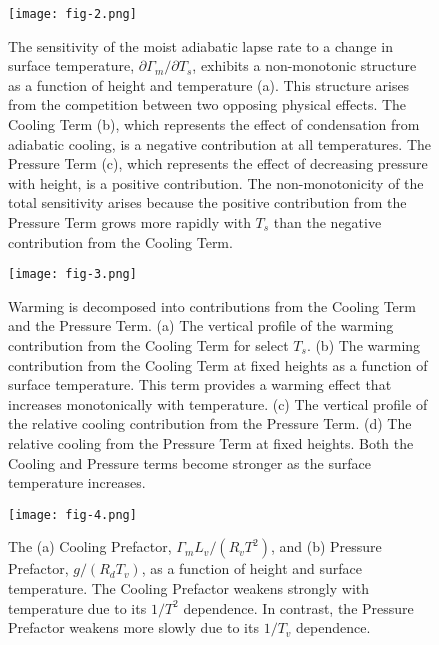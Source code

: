 \documentclass{ametsocV6.1}
\begin{document}
\begin{figure}[htbp]
 \centering
 \texttt{[image: fig-2.png]}\\
 \caption{The sensitivity of the moist adiabatic lapse rate to a change in surface temperature, $\partial\Gamma_m/\partial T_s$, exhibits a non-monotonic structure as a function of height and temperature (a). This structure arises from the competition between two opposing physical effects. The Cooling Term (b), which represents the effect of condensation from adiabatic cooling, is a negative contribution at all temperatures. The Pressure Term (c), which represents the effect of decreasing pressure with height, is a positive contribution. The non-monotonicity of the total sensitivity arises because the positive contribution from the Pressure Term grows more rapidly with $T_s$ than the negative contribution from the Cooling Term.}\label{fig:fig-2}
\end{figure}

\begin{figure}[htbp]
 \centering
 \texttt{[image: fig-3.png]}\\
 \caption{Warming is decomposed into contributions from the Cooling Term and the Pressure Term. (a) The vertical profile of the warming contribution from the Cooling Term for select $T_s$. (b) The warming contribution from the Cooling Term at fixed heights as a function of surface temperature. This term provides a warming effect that increases monotonically with temperature. (c) The vertical profile of the relative cooling contribution from the Pressure Term. (d) The relative cooling from the Pressure Term at fixed heights. Both the Cooling and Pressure terms become stronger as the surface temperature increases.}\label{fig:fig-3}
\end{figure}

\begin{figure}[htbp]
 \centering
 \texttt{[image: fig-4.png]}\\
 \caption{The (a) Cooling Prefactor, $\Gamma_m L_v / (R_v T^2)$, and (b) Pressure Prefactor, $g/(R_d T_v)$, as a function of height and surface temperature. The Cooling Prefactor weakens strongly with temperature due to its $1/T^2$ dependence. In contrast, the Pressure Prefactor weakens more slowly due to its $1/T_v$ dependence.}\label{fig:fig-4}
\end{figure}
\end{document}
